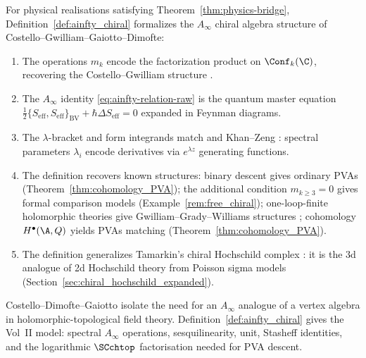 \begin{proposition}
\label{prop:physical_justification}
For physical realisations satisfying Theorem~\ref{thm:physics-bridge}, Definition~\ref{def:ainfty_chiral} formalizes the $A_\infty$ chiral algebra structure of Costello--Gwilliam--Gaiotto--Dimofte:

\begin{enumerate}[label=(\roman*)]
\item The operations $m_k$ encode the factorization product on $\Conf_k(\C)$, recovering the Costello--Gwilliam structure \cite{CG17}.

\item The $A_\infty$ identity \eqref{eq:ainfty-relation-raw} is the quantum master equation
$\frac{1}{2}\{S_{\mathrm{eff}}, S_{\mathrm{eff}}\}_{\mathrm{BV}} + \hbar \Delta S_{\mathrm{eff}} = 0$
expanded in Feynman diagrams.

\item The $\lambda$-bracket and form integrands match \cite{CDG20} and Khan--Zeng \cite{KZ25}: spectral parameters $\lambda_i$ encode derivatives via $e^{\lambda z}$ generating functions.

\item The definition recovers known structures:
binary descent gives ordinary PVAs (Theorem~\ref{thm:cohomology_PVA});
the additional condition $m_{k \geq 3}=0$ gives formal comparison
models (Example~\ref{rem:free_chiral});
one-loop-finite holomorphic theories give Gwilliam--Grady--Williams structures \cite{GGW21};
cohomology $H^\bullet(\A,Q)$ yields PVAs matching \cite{CDG20} (Theorem~\ref{thm:cohomology_PVA}).

\item The definition generalizes Tamarkin's chiral Hochschild complex \cite{Tam02}: it is the 3d analogue of 2d Hochschild theory from Poisson sigma models (Section~\ref{sec:chiral_hochschild_expanded}).
\end{enumerate}
\end{proposition}

\begin{remark}
\label{rem:physical-source-comparison}
Costello--Dimofte--Gaiotto \cite{CDG20} isolate the need for an
$A_\infty$ analogue of a vertex algebra in holomorphic-topological
field theory. Definition~\ref{def:ainfty_chiral} gives the Vol~II
model: spectral $A_\infty$ operations, sesquilinearity, unit,
Stasheff identities, and the logarithmic $\SCchtop$ factorisation
needed for PVA descent.
\end{remark}


